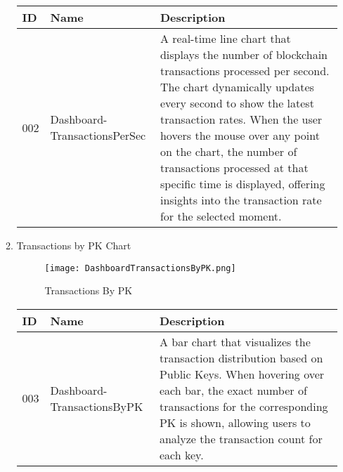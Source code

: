 \documentclass[conference]{IEEEtran}
\begin{document}
\begin{enumerate}[itemsep=2ex, parsep=1ex]
\begin{enumerate}[itemsep=2ex, parsep=1ex]
	      	      \begin{table}[h!]
	      	      	\def\arraystretch{1.24} \small
	      	      	\begin{tabular}{|p{1.2cm}|p{2.5cm}|p{4.0cm}|}
	      	      		\hline
	      	      		ID  & Name                         & Description                                                                                                                                                                                                                                                                                                                                                                                 \\
	      	      		\hline
	      	      		002 & Dashboard-TransactionsPerSec & A real-time line chart that displays the number of blockchain transactions processed per second. The chart dynamically updates every second to show the latest transaction rates. When the user hovers the mouse over any point on the chart, the number of transactions processed at that specific time is displayed, offering insights into the transaction rate for the selected moment. \\
	      	      		\hline
	      	      	\end{tabular}
	      	      \end{table}
	      	      	      	      
	      	\item Transactions by PK Chart

            \begin{figure}[h!]
                \centering
                \texttt{[image: DashboardTransactionsByPK.png]}
                \caption{Transactions By PK}
                \label{fig:enter-label}
            \end{figure}
            
	      	      \begin{table}[h!]
	      	      	\def\arraystretch{1.24} \small
	      	      	\begin{tabular}{|p{1.2cm}|p{2.5cm}|p{4.0cm}|}
	      	      		\hline
	      	      		ID  & Name                       & Description                                                                                                                                                                                                                                   \\
	      	      		\hline
	      	      		003 & Dashboard-TransactionsByPK & A bar chart that visualizes the transaction distribution based on Public Keys. When hovering over each bar, the exact number of transactions for the corresponding PK is shown, allowing users to analyze the transaction count for each key. \\
	      	      		\hline
	      	      	\end{tabular}
	      	      \end{table}


\end{enumerate}
\end{enumerate}
\end{document}
